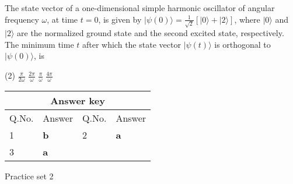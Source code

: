 \begin{enumerate}
\begin{tasks}
\end{tasks}
\begin{minipage}{\textwidth}
	\item The state vector of a one-dimensional simple harmonic oscillator of angular frequency $\omega$, at time $t=0$, is given by $|\psi(0)\rangle=\frac{1}{\sqrt{2}}[|0\rangle+|2\rangle]$, where $|0\rangle$ and $|2\rangle$ are the normalized ground state and the second excited state, respectively. The minimum time $t$ after which the state vector $|\psi(t)\rangle$ is orthogonal to $|\psi(0)\rangle$, is
\end{minipage}
\begin{tasks}(2)
	\task[\textbf{A.}] $\frac{\pi}{2 \omega}$
	\task[\textbf{B.}]$\frac{2 \pi}{\omega}$
	\task[\textbf{C.}]$\frac{\pi}{\omega}$
	\task[\textbf{D.}]$\frac{4 \pi}{\omega}$
\end{tasks}
\end{enumerate}
\setlength\arrayrulewidth{1pt}
\begin{table}[H]
	\centering
	
	\begin{tabular}{|p{1.5cm}|p{1.5cm}||p{1.5cm}|p{1.5cm}|}
		\hline
		\multicolumn{4}{|c|}{\textbf{Answer key}}\\\hline\hline
		\rowcolor{ocrel}Q.No.&Answer&Q.No.&Answer\\\hline
		1&\textbf{b}&2&\textbf{a}\\\hline
		3&\textbf{a}&&\\\hline
	\end{tabular}
\end{table}
\newpage
\begin{abox}
	Practice set 2
	\end{abox}
